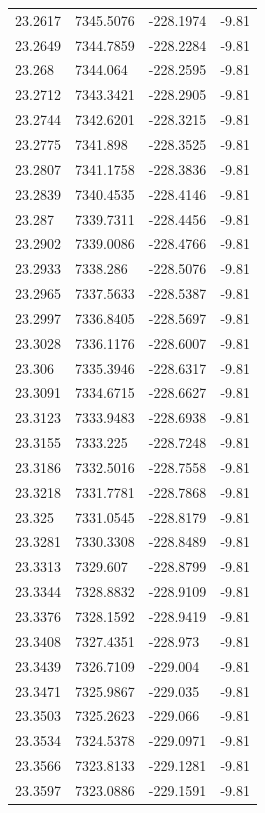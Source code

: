 \begin{table}[H]
\begin{tabular}{llll}
23.2617 & 7345.5076 & -228.1974 & -9.81 \\
23.2649 & 7344.7859 & -228.2284 & -9.81 \\
23.268 & 7344.064 & -228.2595 & -9.81 \\
23.2712 & 7343.3421 & -228.2905 & -9.81 \\
23.2744 & 7342.6201 & -228.3215 & -9.81 \\
23.2775 & 7341.898 & -228.3525 & -9.81 \\
23.2807 & 7341.1758 & -228.3836 & -9.81 \\
23.2839 & 7340.4535 & -228.4146 & -9.81 \\
23.287 & 7339.7311 & -228.4456 & -9.81 \\
23.2902 & 7339.0086 & -228.4766 & -9.81 \\
23.2933 & 7338.286 & -228.5076 & -9.81 \\
23.2965 & 7337.5633 & -228.5387 & -9.81 \\
23.2997 & 7336.8405 & -228.5697 & -9.81 \\
23.3028 & 7336.1176 & -228.6007 & -9.81 \\
23.306 & 7335.3946 & -228.6317 & -9.81 \\
23.3091 & 7334.6715 & -228.6627 & -9.81 \\
23.3123 & 7333.9483 & -228.6938 & -9.81 \\
23.3155 & 7333.225 & -228.7248 & -9.81 \\
23.3186 & 7332.5016 & -228.7558 & -9.81 \\
23.3218 & 7331.7781 & -228.7868 & -9.81 \\
23.325 & 7331.0545 & -228.8179 & -9.81 \\
23.3281 & 7330.3308 & -228.8489 & -9.81 \\
23.3313 & 7329.607 & -228.8799 & -9.81 \\
23.3344 & 7328.8832 & -228.9109 & -9.81 \\
23.3376 & 7328.1592 & -228.9419 & -9.81 \\
23.3408 & 7327.4351 & -228.973 & -9.81 \\
23.3439 & 7326.7109 & -229.004 & -9.81 \\
23.3471 & 7325.9867 & -229.035 & -9.81 \\
23.3503 & 7325.2623 & -229.066 & -9.81 \\
23.3534 & 7324.5378 & -229.0971 & -9.81 \\
23.3566 & 7323.8133 & -229.1281 & -9.81 \\
23.3597 & 7323.0886 & -229.1591 & -9.81 \\

\end{tabular}
\end{table}
